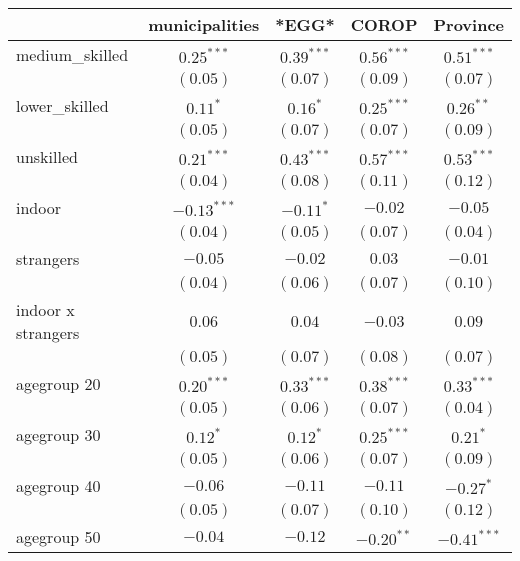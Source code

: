 
\begin{table}
\begin{center}
\begin{tabular}{l c c c c }
\hline
 & municipalities & *EGG* & COROP & Province \\
\hline
medium\_skilled    & $0.25^{***}$  & $0.39^{***}$  & $0.56^{***}$  & $0.51^{***}$  \\
                   & $(0.05)$      & $(0.07)$      & $(0.09)$      & $(0.07)$      \\
lower\_skilled     & $0.11^{*}$    & $0.16^{*}$    & $0.25^{***}$  & $0.26^{**}$   \\
                   & $(0.05)$      & $(0.07)$      & $(0.07)$      & $(0.09)$      \\
unskilled          & $0.21^{***}$  & $0.43^{***}$  & $0.57^{***}$  & $0.53^{***}$  \\
                   & $(0.04)$      & $(0.08)$      & $(0.11)$      & $(0.12)$      \\
indoor             & $-0.13^{***}$ & $-0.11^{*}$   & $-0.02$       & $-0.05$       \\
                   & $(0.04)$      & $(0.05)$      & $(0.07)$      & $(0.04)$      \\
strangers          & $-0.05$       & $-0.02$       & $0.03$        & $-0.01$       \\
                   & $(0.04)$      & $(0.06)$      & $(0.07)$      & $(0.10)$      \\
indoor x strangers & $0.06$        & $0.04$        & $-0.03$       & $0.09$        \\
                   & $(0.05)$      & $(0.07)$      & $(0.08)$      & $(0.07)$      \\
agegroup 20        & $0.20^{***}$  & $0.33^{***}$  & $0.38^{***}$  & $0.33^{***}$  \\
                   & $(0.05)$      & $(0.06)$      & $(0.07)$      & $(0.04)$      \\
agegroup 30        & $0.12^{*}$    & $0.12^{*}$    & $0.25^{***}$  & $0.21^{*}$    \\
                   & $(0.05)$      & $(0.06)$      & $(0.07)$      & $(0.09)$      \\
agegroup 40        & $-0.06$       & $-0.11$       & $-0.11$       & $-0.27^{*}$   \\
                   & $(0.05)$      & $(0.07)$      & $(0.10)$      & $(0.12)$      \\
agegroup 50        & $-0.04$       & $-0.12$       & $-0.20^{**}$  & $-0.41^{***}$ \\

\end{tabular}
\end{center}
\end{table}
